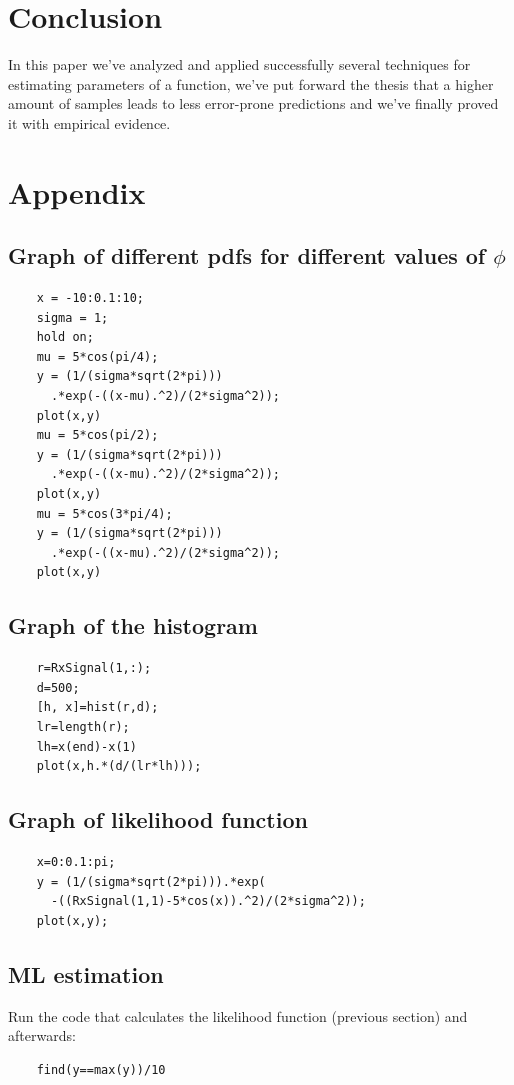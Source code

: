 \documentclass[conference,9pt]{IEEEtran}
\begin{document}
\section{Conclusion}
In this paper we've analyzed and applied successfully several techniques for estimating parameters of a function, we've put forward the thesis that a higher amount of samples leads to less error-prone predictions and we've finally proved it with empirical evidence.

\section{Appendix}
\subsection{Graph of different pdfs for different values of $\phi$}
\begin{verbatim}
    x = -10:0.1:10;
    sigma = 1;
    hold on;
    mu = 5*cos(pi/4);
    y = (1/(sigma*sqrt(2*pi)))
      .*exp(-((x-mu).^2)/(2*sigma^2));
    plot(x,y)
    mu = 5*cos(pi/2);
    y = (1/(sigma*sqrt(2*pi)))
      .*exp(-((x-mu).^2)/(2*sigma^2));
    plot(x,y)
    mu = 5*cos(3*pi/4);
    y = (1/(sigma*sqrt(2*pi)))
      .*exp(-((x-mu).^2)/(2*sigma^2));
    plot(x,y)
  \end{verbatim}

\subsection{Graph of the histogram}
  \begin{verbatim}
    r=RxSignal(1,:);
    d=500;
    [h, x]=hist(r,d);
    lr=length(r);
    lh=x(end)-x(1)
    plot(x,h.*(d/(lr*lh)));
  \end{verbatim}

 \subsection{Graph of likelihood function}
 \begin{verbatim}
    x=0:0.1:pi;
    y = (1/(sigma*sqrt(2*pi))).*exp(
      -((RxSignal(1,1)-5*cos(x)).^2)/(2*sigma^2));
    plot(x,y);
  \end{verbatim}

\subsection{ML estimation}
Run the code that calculates the likelihood function (previous section) and afterwards:
  \begin{verbatim}
    find(y==max(y))/10
   \end{verbatim}
\end{document}
